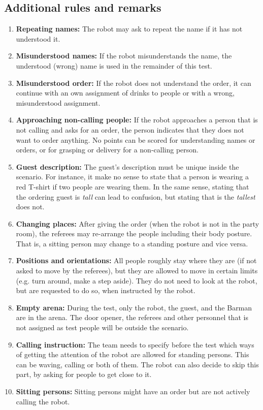 \subsection{Additional rules and remarks}
\begin{enumerate}
	\item \textbf{Repeating names:} The robot may ask to repeat the name if it has not understood it.

	\item \textbf{Misunderstood names:} If the robot misunderstands the name, the understood (wrong) name is used in the remainder of this test.

	\item \textbf{Misunderstood order:} If the robot does not understand the order, it can continue with an own assignment of drinks to people or with a wrong, misunderstood assignment.

	\item \textbf{Approaching non-calling people:} If the robot approaches a person that is not calling and asks for an order, the person indicates that they does not want to order anything. No points can be scored for understanding names or orders, or for grasping or delivery for a non-calling person.

	\item \textbf{Guest description:} The guest's description must be unique inside the scenario. For instance, it make no sense to state that a person is wearing a red T-shirt if two people are wearing them. In the same sense, stating that the ordering guest is \textit{tall} can lead to confusion, but stating that is the \textit{tallest} does not.

	\item \textbf{Changing places:} After giving the order (when the robot is not in the party room), the referees may re-arrange the people including their body posture. That is, a sitting person may change to a standing posture and vice versa.

	\item \textbf{Positions and orientations:} All people roughly stay where they are (if not asked to move by the referees), but they are allowed to move in certain limits (e.g. turn around, make a step aside). They do not need to look at the robot, but are requested to do so, when instructed by the robot.

	\item \textbf{Empty arena:} During the test, only the robot, the guest, and the Barman are in the arena. The door opener, the referees and other personnel that is not assigned as test people will be outside the scenario.

	\item \textbf{Calling instruction:} The team needs to specify before the test which ways of getting the attention of the robot are allowed for standing persons. This can be waving, calling or both of them. The robot can also decide to skip this part, by asking for people to get close to it.
	
	\item \textbf{Sitting persons:} Sitting persons might have an order but are not actively calling the robot.
\end{enumerate}

